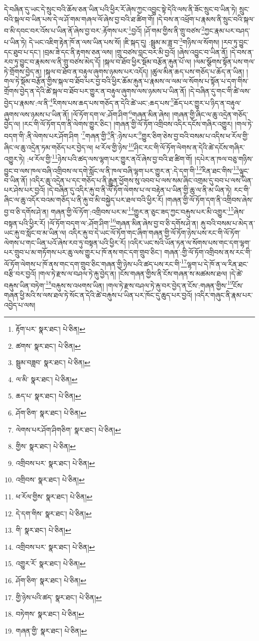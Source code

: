 དེ་བཞིན་དུ་ཡང་དེ་སྲུང་བའི་ཆོས་ཅན་ཡིན་པའི་ཕྱིར་རོ་ཞེས་ཀྱང་འབྱུང་སྟེ་དེའི་ལས་ནི་ཟོང་སྲུང་བ་ཡིན་ཏེ། སྲུང་བའི་སྐལ་བ་ཡིན་པས་དེ་ལ་ཤོ་གམ་གཞལ་ལོ་ཞེས་བྱ་བའི་ཐ་ཚིག་གོ། །དེ་བས་ན་འཕྲོག་པ་རྣམས་ནི་སྲུང་བའི་སྐལ་བ་མི་དབང་བར་འོས་པ་ཡིན་ནོ་ཞེས་བྱ་བར་:རྟོགས་པར་\footnote{རྟོག་པར་  སྣར་ཐང་།  པེ་ཅིན། }བྱའོ། །ཤོ་གམ་གྱིས་ནི་གྲུ་བཙས་\footnote{ཚགས་  སྣར་ཐང་།  པེ་ཅིན། }ཀྱང་རྣམ་པར་བཤད་པ་ཡིན་ཏེ། དེ་ཡང་འཇིག་རྟེན་ཁོ་ན་ལས་ཡིན་པས་སོ། །ཇི་སྐད་དུ། :སྦྲུམ་མ་ཟླ་བ་\footnote{སྦྲུམ་བཟླབ་  སྣར་ཐང་།  པེ་ཅིན། }གཉིས་ལ་སོགས། །རབ་ཏུ་བྱུང་དང་ཐུབ་པ་དང་། །བྲམ་ཟེ་དང་ནི་རྟགས་ཅན་ལས། །གྲུ་བཙས་བླང་བར་མི་བྱའོ། །ཞེས་འབྱུང་བ་ཡིན་ནོ། །དེ་བས་ན་རབ་ཏུ་བྱུང་བ་རྣམས་ལ་ནི་གྲུ་བཙས་མེད་དོ། །སྐལ་བ་ཐོབ་ཕྱིར་སྡོམ་བརྩོན་རྐུན་པོ་ལ། །ལམ་སྩོགས་སྟོན་པས་གལ་ཏེ་གྲོགས་བྱེད་ན། །སྐལ་བ་ཐོབ་ན་བརྟུལ་ཞུགས་ཉམས་པར་འདོད། །ཚུལ་མིན་ཆད་པས་གཅོད་པ་ཆོད་ན་ཡིན། །གལ་ཏེ་སྡོམ་བརྩོན་གྱིས་སྐལ་བ་ཐོབ་པར་བྱ་བའི་ཕྱིར་ཆོམ་རྐུན་པ་རྣམས་ལ་ལམ་ལ་སོགས་པ་སྟོན་པ་དག་གིས་གྲོགས་བྱེད་ན་དེའི་ཚེ་སྐལ་བ་ཐོབ་པར་གྱུར་ན་བརྟུལ་ཞུགས་ལས་ཉམས་པ་ཡིན་ནོ། །དེ་བཞིན་དུ་གང་གི་ཚེ་ལས་བྱེད་པ་རྣམས་:ལ་ནི་\footnote{ལ་མི་  སྣར་ཐང་།  པེ་ཅིན། }རིགས་པས་ཆད་པས་གཅོད་ན་དེའི་ཚེ་ཡང་:ཆད་པས་\footnote{ཆད་པ་  སྣར་ཐང་།  པེ་ཅིན། }ཆོད་པར་གྱུར་པ་ཉིད་ན་བརྟུལ་ཞུགས་ལས་ཉམས་པ་ཡིན་ནོ། །ལོ་ཏོག་དག་ལ་:ཤོག་ཤིག་\footnote{ཤོག་ཅིག་  སྣར་ཐང་།  པེ་ཅིན། }གཞན་མིན་ཞེས། །གཞན་གྱི་ཞིང་ལ་ཆུ་འདྲེན་གཅོད་བྱེད་ལ། །རང་གི་ལོ་ཏོག་དག་ནི་ལེགས་གྱུར་ཅིང་། །གཞན་གྱི་ལོ་ཏོག་འགྲིབས་འདིར་དངོས་གཞིར་འགྱུར། །གལ་ཏེ་བདག་གི་:ནི་ལེགས་པར་ཤོག་ཤིག ་\footnote{ལེགས་པར་ཤོག་ཤིགཅིག་  སྣར་ཐང་།  པེ་ཅིན། }གཞན་གྱི་\footnote{གྱིས་  སྣར་ཐང་།  པེ་ཅིན། }ནི་:ཉེས་པར་\footnote{འགྲིབས་པར་  སྣར་ཐང་།  པེ་ཅིན། }གྱུར་ཅིག་ཅེས་བྱ་བའི་བསམ་པ་འདིས་ཕ་རོལ་གྱི་ཞིང་ལ་ཆུ་འདྲེན་ཏམ་གཅོད་པར་བྱེད་ལ། ཕ་རོལ་གྱི་ཉེས་\footnote{འགྲིབས་  སྣར་ཐང་།  པེ་ཅིན། }ཤིང་རང་གི་ལོ་ཏོག་ལེགས་ན་དེའི་ཚེ་དངོས་གཞིར་འགྱུར་ཏེ། :ཕ་རོལ་གྱི་\footnote{ཕ་རོལ་གྱིས་  སྣར་ཐང་།  པེ་ཅིན། }ཉེས་པའི་ཚད་ལས་ལྷག་པར་གྱུར་ནའོ་ཞེས་བྱ་བའི་ཐ་ཚིག་གོ། །དཔེར་ན་ཁལ་བཅུ་གཉིས་བྱུང་བ་ལས་ཁལ་བཞི་འགྲིབས་ལ་དགེ་སློང་ལ་ནི་ཁལ་བཞི་ལྷག་པར་གྱུར་ན་:དེ་དག་གི་\footnote{དེ་དག་གིས་  སྣར་ཐང་།  པེ་ཅིན། }རིན་ཐང་གིས་\footnote{གི་  སྣར་ཐང་།  པེ་ཅིན། }ལྟུང་བ་ཡིན་ནོ། །འདིར་ཆུ་འདྲེན་པ་དང་གཅོད་པ་ནི་རྒྱུན་ཕྱོགས་སུ་འབབ་པ་ལས་སམ་ཞིང་འགྲམ་དུ་བབ་པ་ལས་ཡིན་པར་ཤེས་པར་བྱའོ། །དེ་བཞིན་དུ་འདིར་རྐུ་བ་ནི་ལོ་ཏོག་ལེགས་པ་ལ་བརྟེན་པ་ཡིན་གྱི་ཆུ་ལ་ནི་མ་ཡིན་ཏེ། རང་གི་ཞིང་ལ་ཆུ་འདོར་བའམ་གཅོད་པ་ནི་རྐུ་བ་མི་བསྐྱེད་པར་ཐལ་བའི་ཕྱིར་རོ། །གཞན་གྱི་ལོ་ཏོག་དག་ནི་འགྲིབས་ཞེས་བྱ་བ་ཅི་དགོས་ཤེ་ན། གཞན་གྱི་ལོ་ཏོག་:འགྲིབས་པར་མ་\footnote{འགྲིབས་པར་  སྣར་ཐང་།  པེ་ཅིན། }གྱུར་ན་ཅུང་ཟད་ཀྱང་བརྐུས་པར་མི་འགྱུར་\footnote{འགྱུར་རོ་  སྣར་ཐང་།  པེ་ཅིན། }ཞེས་བསྟན་པའི་ཕྱིར་རོ། །ལོ་ཏོག་བདག་ལ་:ཤོག་ཤིག་\footnote{ཤོག་ཅིག་  སྣར་ཐང་།  པེ་ཅིན། }གཞན་མིན་ཞེས་བྱ་བ་ཅི་དགོས་ཤེ་ན། རྐུ་བའི་བསམ་པ་མེད་ན་ཡང་རྐུ་བ་སློང་བ་མ་ཡིན་ལ། འདིར་རྐུ་བ་དེ་ཡང་ལོ་ཏོག་གང་ཞིག་གཞན་གྱི་ལོ་ཏོག་ཉེས་པས་རང་གི་ལོ་ཏོག་ལེགས་པ་གང་ཡིན་པའོ་ཞེས་རབ་ཏུ་བསྟན་པའི་ཕྱིར་རོ། །འདིར་ཡང་སའི་ཡོན་ཏན་ལ་སོགས་པས་གང་དག་ལྷག་པར་གྲུབ་པ་མ་གཏོགས་པར་ཆུ་ལས་གྱུར་པ་ཁོ་ནས་གང་དག་གྲུབ་ཅིང་། གཞན་:གྱི་ལོ་ཏོག་འགྲིབས་ནས་རང་གི་ལོ་ཏོག་ལེགས་པ་ཁོ་ནས་གང་དག་གྲུབ་ཅིང་གཞན་གྱི་ཉེས་པའི་ཚད་པས་རང་གི་\footnote{གྱི་ཉེས་པའི་ཚད་  སྣར་ཐང་།  པེ་ཅིན། }ལྷག་པ་དེ་ཁོ་ན་ལ་རིན་ཐང་བརྩི་བར་བྱའོ། །གལ་ཏེ་རྫས་ལ་བཤལ་ཏེ་རྐུ་བྱེད་ན། །ངོས་གཞན་གྱིས་ནི་ངོས་གཞན་ས་མཚམས་ཐལ། །དེ་ཚེ་བརྐུས་ཡིན་བཏེག་\footnote{བཏེགས་  སྣར་ཐང་།  པེ་ཅིན། }བརྐུས་ས་འཕགས་ཡིན། །གལ་ཏེ་རྫས་བཤལ་ཏེ་རྐུ་བར་བྱེད་ན་ངོས་:གཞན་གྱིས་\footnote{གཞན་གྱི་  སྣར་ཐང་།  པེ་ཅིན། }ངོས་གཞན་ཕྱི་མའི་ས་ལས་ཐལ་ཏེ་སོང་ན་དེའི་ཚེ་བརྐུས་པ་ཡིན་པར་ཁོང་དུ་ཆུད་པར་བྱའོ། །འདིར་གཞུང་ནི་རྣམ་པར་འབྱེད་པ་ལས། 